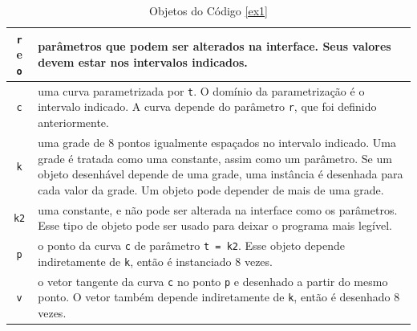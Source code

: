 \begin{table}[ht]
\caption{Objetos do Código \ref{ex1}}
\label{objtypes}
\begin{centering}
\begin{tabularx}{\textwidth}{||c|X||}
    \hline
    \texttt{r} e \texttt{o} & parâmetros que podem ser alterados na interface.
    Seus valores devem estar nos intervalos indicados. \\ 

    \hline
    \texttt{c} & uma curva parametrizada por \texttt{t}.
    O domínio da parametrização é o intervalo indicado.
    A curva depende do parâmetro \texttt{r}, que foi definido anteriormente. \\

    \hline
    \texttt{k} & uma grade de 8 pontos igualmente espaçados no intervalo indicado.
    Uma grade é tratada como uma constante, assim como um parâmetro.
    Se um objeto desenhável depende de uma grade, uma instância é desenhada para cada valor da grade.
    Um objeto pode depender de mais de uma grade. \\

    \hline
    \texttt{k2} & uma constante, e não pode ser alterada na interface como os parâmetros.
    Esse tipo de objeto pode ser usado para deixar o programa mais legível. \\
    
    \hline
    \texttt{p} & o ponto da curva \texttt{c} de parâmetro \texttt{t = k2}.
    Esse objeto depende indiretamente de \texttt{k}, então é instanciado 8 vezes. \\
    
    \hline
    \texttt{v} & o vetor tangente da curva \texttt{c} no ponto \texttt{p} 
    e desenhado a partir do mesmo ponto.
    O vetor também depende indiretamente de \texttt{k}, então é desenhado 8 vezes. \\
    \hline
\end{tabularx}
\end{centering}
\end{table}

